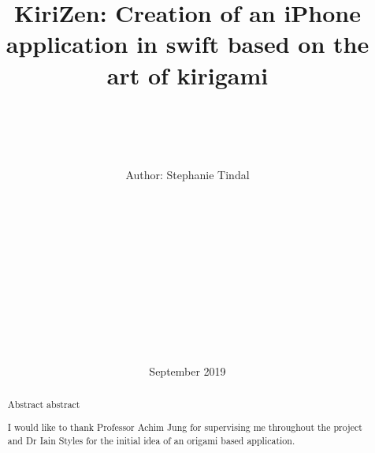\documentclass[11pt]{article}
\begin{document}
\begin{titlepage}
    \title{\vspace{40pt}\Huge KiriZen: Creation of an iPhone application in swift based on the art of kirigami}

    \author{ \\\hline \\\\\\ \Large \vspace{5pt} Author: Stephanie Tindal \\\Large \vspace{5pt}{Student ID: 1936508}\\\Large \vspace{50pt}{Supervisor: Achim Jung} \\ \hline\\\\\\  \vspace{5pt}{MSc Computer Science} \\ \vspace{5pt}{School of Computer Science, University of Birmingham}\\\\\\ \hline\\\\}

    \date{September 2019 \vspace{20pt}}
    \maketitle
\end{titlepage}
\begin{frame}{}
    \begin{multicols}{2}
    \tableofcontents

\end{multicols}
\end{frame}

\newpage

\begin{abstract}
    Abstract abstract 

\end{abstract}

\vspace{50pt}
\renewcommand{\abstractname}{Acknowledgements}
\begin{abstract}
    I would like to thank Professor Achim Jung for supervising me throughout the project and Dr Iain Styles for the initial idea of an origami based application. 
\end{abstract}
\end{document}
